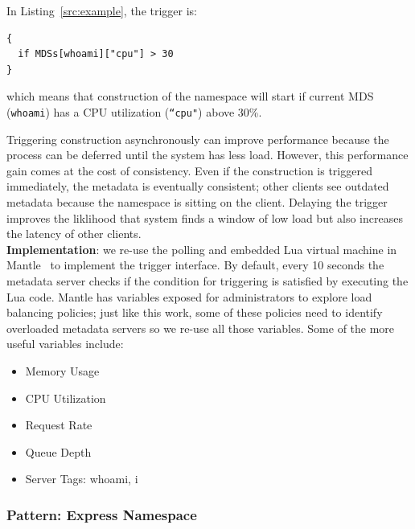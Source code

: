 In Listing~\ref{src:example}, the trigger is:
\begin{listing}
\begin{verbatim}
{
  if MDSs[whoami]["cpu"] > 30
}
\end{verbatim}
\label{src:thresh}
\end{listing}

which means that construction of the namespace will start if current MDS
(\texttt{whoami}) has a CPU utilization (\texttt{``cpu"}) above 30\%.

Triggering construction asynchronously can improve performance because the
process can be deferred until the system has less load. However, this
performance gain comes at the cost of consistency. Even if the construction is
triggered immediately, the metadata is eventually consistent; other clients see
outdated metadata because the namespace is sitting on the client. Delaying the
trigger improves the liklihood that system finds a window of low load but also
increases the latency of other clients.\\

\noindent\textbf{Implementation}: we re-use the polling and embedded Lua
virtual machine in Mantle~\cite{sevilla:sc15-mantle} to implement the trigger
interface. By default, every 10 seconds the metadata server checks if the
condition for triggering is satisfied by executing the Lua code. Mantle has
variables exposed for administrators to explore load balancing policies; just
like this work, some of these policies need to identify overloaded metadata
servers so we re-use all those variables.  Some of the more useful variables
include:

\begin{itemize}
  \item Memory Usage
  \item CPU Utilization
  \item Request Rate
  \item Queue Depth
  \item Server Tags: whoami, i
\end{itemize}

\subsubsection{Pattern: Express Namespace}
\label{sec:pattern-express-namespace}

